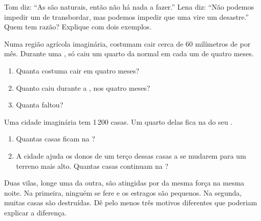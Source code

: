 \begin{exercise}[$\star\star$]\label{exo:g5:natural-hazards:8}
Tom diz: ``As  são naturais, então não há nada a fazer.'' Lena
diz: ``Não podemos impedir um  de transbordar, mas podemos impedir que
uma  vire um desastre.'' Quem tem razão? Explique com dois
exemplos.
\end{exercise}

\begin{exercise}[$\star\star$]\label{exo:g5:natural-hazards:9}
Numa região agrícola imaginária, costumam cair cerca de 60 milímetros de
 por mês. Durante uma , só caiu um quarto da  normal em cada
um de quatro meses.
\begin{enumerate}
  \item[(a)] Quanta  costuma cair em quatro meses?
  \item[(b)] Quanto caiu durante a , nos quatro meses?
  \item[(c)] Quanta  faltou?
\end{enumerate}
\end{exercise}

\begin{exercise}[$\star\star$]\label{exo:g5:natural-hazards:10}
Uma cidade imaginária tem 1\,200 casas. Um quarto delas fica na  do seu .
\begin{enumerate}
  \item[(a)] Quantas casas ficam na ?
  \item[(b)] A cidade ajuda os donos de um terço dessas casas a se mudarem
        para um terreno mais alto. Quantas casas continuam na ?
\end{enumerate}
\end{exercise}

\begin{exercise}[$\star\star\star$]\label{exo:g5:natural-hazards:11}
Duas vilas, longe uma da outra, são atingidas por  da mesma
força na mesma noite. Na primeira, ninguém se fere e os estragos são
pequenos. Na segunda, muitas casas são destruídas. Dê pelo menos três
motivos diferentes que poderiam explicar a diferença.
\end{exercise}
